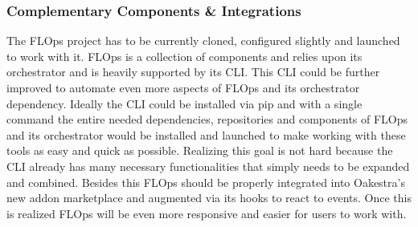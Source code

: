 \subsubsection{Complementary Components \& Integrations}
The FLOps project has to be currently cloned, configured slightly and launched to work with it.
FLOps is a collection of components and relies upon its orchestrator and is heavily supported by its CLI.
This CLI could be further improved to automate even more aspects of FLOps and its orchestrator dependency.
Ideally the CLI could be installed via pip and with a single command the entire needed dependencies, repositories and components of FLOps and its orchestrator would be installed and launched to make working with these tools as easy and quick as possible.
Realizing this goal is not hard because the CLI already has many necessary functionalities that simply needs to be expanded and combined.
Besides this FLOps should be properly integrated into Oakestra's new addon marketplace and augmented via its hooks to react to events.
Once this is realized FLOps will be even more responsive and easier for users to work with.

